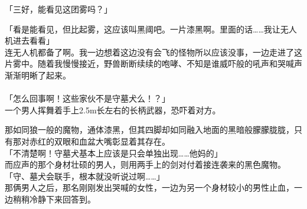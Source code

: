 「三好，能看见这团雾吗？」

「看是能看见，但比起雾，这应该叫黑阈吧。一片漆黑啊。里面的话……我让无人机进去看看」\\

连无人机都备了啊。我一边想着这边没有会飞的怪物所以应该没事，一边走进了这片雾中。随着我慢慢接近，野兽断断续续的咆哮、不知是谁威吓般的吼声和哭喊声渐渐明晰了起来。\\

\sqsplit\\

「怎么回事啊！这些家伙不是守墓犬么！？」\\

一个男人挥舞着手上2.5m长左右的长柄武器，恐吓着对方。

那如同狼一般的魔物，通体漆黑，但其四脚却如同融入地面的黑暗般朦朦胧胧，只有那对赤红的双眼和血盆大嘴彰显着其存在。\\

「不清楚啊！守墓犬基本上应该是只会单独出现……他妈的」\\

而应声的那个身材壮硕的男人，则用两手上的剑对付着接连袭来的黑色魔物。\\

「守、墓犬会联手，根本就没听说过啊……」\\

那俩男人之后，那名刚刚发出哭喊的女性，一边为另一个身材较小的男性止血，一边稍稍冷静下来回答到。\\

